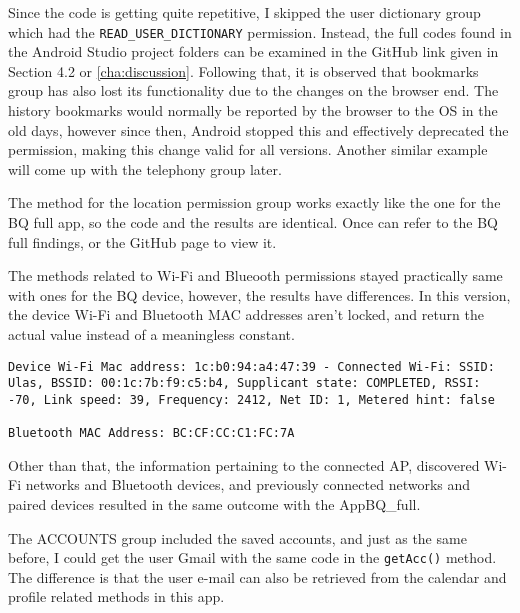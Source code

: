 \documentclass[
  a4paper,  %
  twoside,  %
  bibliography=totoc,
  headsepline,
  cleardoublepage=empty,
  parskip=half,
  draft=false,
  open=any
]{scrbook}
\begin{document}
Since the code is getting quite repetitive, I skipped the user dictionary group which had the \texttt{READ\_USER\_DICTIONARY} permission. Instead, the full codes found in the Android Studio project folders can be examined in the GitHub link given in Section 4.2 or \cref{cha:discussion}. Following that, it is observed that bookmarks group has also lost its functionality due to the changes on the browser end. The history bookmarks would normally be reported by the browser to the OS in the old days, however since then, Android stopped this and effectively deprecated the permission, making this change valid for all versions. Another similar example will come up with the telephony group later.

The method for the location permission group works exactly like the one for the BQ full app, so the code and the results are identical. Once can refer to the BQ full findings, or the GitHub page to view it.

The methods related to Wi-Fi and Blueooth permissions stayed practically same with ones for the BQ device, however, the results have differences. In this version, the device Wi-Fi and Bluetooth MAC addresses aren't locked, and return the actual value instead of a meaningless constant.
\begin{lstlisting}
Device Wi-Fi Mac address: 1c:b0:94:a4:47:39 - Connected Wi-Fi: SSID: Ulas, BSSID: 00:1c:7b:f9:c5:b4, Supplicant state: COMPLETED, RSSI: -70, Link speed: 39, Frequency: 2412, Net ID: 1, Metered hint: false

Bluetooth MAC Address: BC:CF:CC:C1:FC:7A
\end{lstlisting}
Other than that, the information pertaining to the connected AP, discovered Wi-Fi networks and Bluetooth devices, and previously connected networks and paired devices resulted in the same outcome with the AppBQ\_full.

The ACCOUNTS group included the saved accounts, and just as the same before, I could get the user Gmail with the same code in the \texttt{getAcc()} method. The difference is that the user e-mail can also be retrieved from the calendar and profile related methods in this app.
\end{document}
